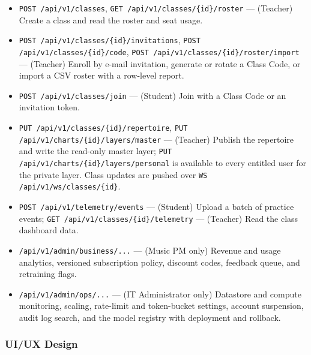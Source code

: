 \documentclass[a4paper]{article}
\begin{document}
\begin{itemize}
    \item \texttt{POST /api/v1/classes}, \texttt{GET /api/v1/classes/\{id\}/roster} --- (Teacher) Create a class and read the roster and seat usage.
    \item \texttt{POST /api/v1/classes/\{id\}/invitations}, \texttt{POST /api/v1/classes/\{id\}/code}, \texttt{POST /api/v1/classes/\{id\}/roster/import} --- (Teacher) Enroll by e-mail invitation, generate or rotate a Class Code, or import a CSV roster with a row-level report.
    \item \texttt{POST /api/v1/classes/join} --- (Student) Join with a Class Code or an invitation token.
    \item \texttt{PUT /api/v1/classes/\{id\}/repertoire}, \texttt{PUT /api/v1/charts/\{id\}/layers/master} --- (Teacher) Publish the repertoire and write the read-only master layer; \texttt{PUT /api/v1/charts/\{id\}/layers/personal} is available to every entitled user for the private layer. Class updates are pushed over \texttt{WS /api/v1/ws/classes/\{id\}}.
    \item \texttt{POST /api/v1/telemetry/events} --- (Student) Upload a batch of practice events; \texttt{GET /api/v1/classes/\{id\}/telemetry} --- (Teacher) Read the class dashboard data.
    \item \texttt{/api/v1/admin/business/...} --- (Music PM only) Revenue and usage analytics, versioned subscription policy, discount codes, feedback queue, and retraining flags.
    \item \texttt{/api/v1/admin/ops/...} --- (IT Administrator only) Datastore and compute monitoring, scaling, rate-limit and token-bucket settings, account suspension, audit log search, and the model registry with deployment and rollback.
\end{itemize}

\subsubsection{UI/UX Design}
\end{document}
